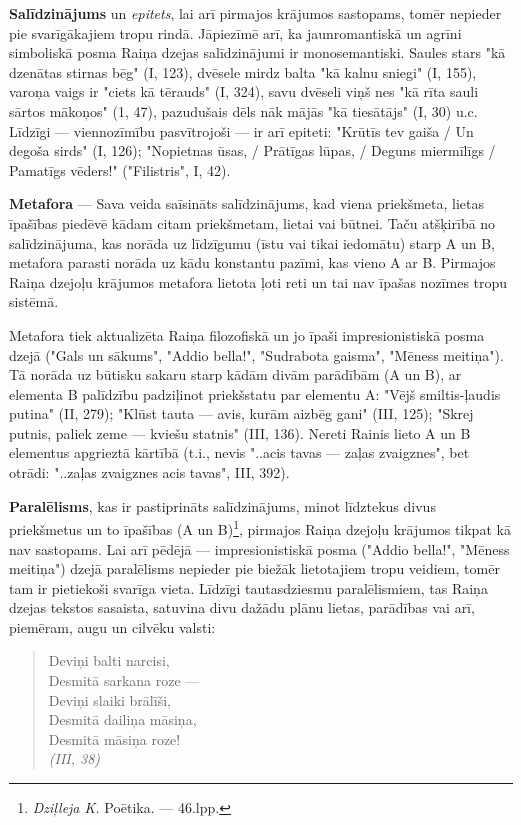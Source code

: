\documentclass[11pt]{article}
\begin{document}
{\bf Salīdzinājums} un {\em epitets}, lai arī
pirmajos krājumos sastopams, tomēr nepieder pie
svarīgākajiem tropu rindā. Jāpiezīmē arī, ka
jaunromantiskā un agrīni simboliskā posma Raiņa
dzejas salīdzinājumi ir monosemantiski. Saules stars
"kā dzenātas stirnas bēg" (I, 123), dvēsele mirdz
balta "kā kalnu sniegi" (I, 155), varoņa vaigs
ir "ciets kā tērauds" (I, 324), savu dvēseli viņš nes
"kā rīta sauli sārtos mākoņos" (1, 47), pazudušais
dēls nāk mājās "kā tiesātājs" (I, 30) u.c.
Līdzīgi --- viennozīmību pasvītrojoši --- ir arī
epiteti: "Krūtīs tev gaiša / Un degoša sirds" (I, 126);
"Nopietnas ūsas, / Prātīgas lūpas, / Deguns miermīlīgs /
Pamatīgs vēders!" ("Filistris", I, 42).

{\bf Metafora} --- Sava veida saīsināts salīdzinājums,
kad viena priekšmeta, lietas īpašības piedēvē kādam
citam priekšmetam, lietai vai būtnei. Taču atšķirībā
no salīdzinājuma, kas norāda uz līdzīgumu (īstu
vai tikai iedomātu) starp A un B, metafora parasti
norāda uz kādu konstantu pazīmi, kas vieno A ar B.
Pirmajos Raiņa dzejoļu krājumos metafora lietota
ļoti reti un tai nav īpašas nozīmes tropu sistēmā.

Metafora tiek aktualizēta Raiņa filozofiskā un jo īpaši
impresionistiskā posma dzejā ("Gals un sākums",
"Addio bella!", "Sudrabota gaisma", "Mēness meitiņa").
Tā norāda uz būtisku sakaru starp kādām divām
parādībām (A un B), ar elementa B palīdzību padziļinot
priekšstatu par elementu A: "Vējš smiltis-ļaudis putina" (II, 279);
"Klūst tauta --- avis, kurām aizbēg gani" (III, 125);
"Skrej putnis, paliek zeme --- kviešu statnis"
(III, 136). Nereti Rainis lieto A un B elementus
apgrieztā kārtībā (t.i., nevis "..acis tavas ---
zaļas zvaigznes", bet otrādi: "..zaļas zvaigznes acis tavas",
III, 392).

{\bf Paralēlisms}, kas ir pastiprināts salīdzinājums, minot
līdztekus divus priekšmetus un to īpašības
(A un B)\footnote{{\em Dziļleja K.} Poētika. --- 46.lpp.},
pirmajos Raiņa dzejoļu krājumos tikpat kā nav sastopams.
Lai arī pēdējā --- impresionistiskā posma ("Addio bella!",
"Mēness meitiņa") dzejā paralēlisms nepieder pie biežāk
lietotajiem tropu veidiem, tomēr tam ir pietiekoši svarīga vieta.
Līdzīgi tautasdziesmu paralēlismiem, tas Raiņa dzejas
tekstos sasaista, satuvina divu dažādu plānu lietas, parādības
vai arī, piemēram, augu un cilvēku valsti:

\begin{quote}
Deviņi balti narcisi,\\
Desmitā sarkana roze ---\\
Deviņi slaiki brālīši,\\
Desmitā dailiņa māsiņa,\\
Desmitā māsiņa roze!\\
{\em (III, 38)}
\end{quote}
\end{document}
